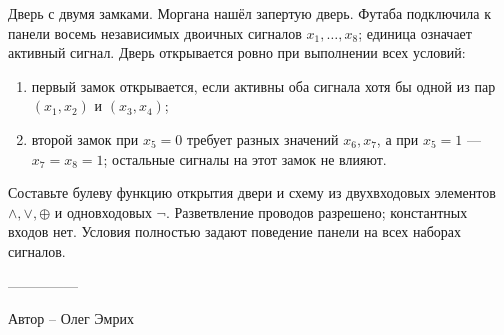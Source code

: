 \question
Дверь с двумя замками. Моргана нашёл запертую дверь. Футаба подключила к панели восемь независимых двоичных сигналов $x_1,\ldots,x_8$; единица означает активный сигнал. Дверь открывается ровно при выполнении всех условий:
\begin{enumerate}
\item первый замок открывается, если активны оба сигнала хотя бы одной из пар $(x_1,x_2)$ и $(x_3,x_4)$;
\item второй замок при $x_5=0$ требует разных значений $x_6,x_7$, а при $x_5=1$ --- $x_7=x_8=1$; остальные сигналы на этот замок не влияют.
\end{enumerate}
Составьте булеву функцию открытия двери и схему из двухвходовых элементов $\land,\lor,\oplus$ и одновходовых $\neg$. Разветвление проводов разрешено; константных входов нет. Условия полностью задают поведение панели на всех наборах сигналов.

---------------

Автор -- Олег Эмрих
